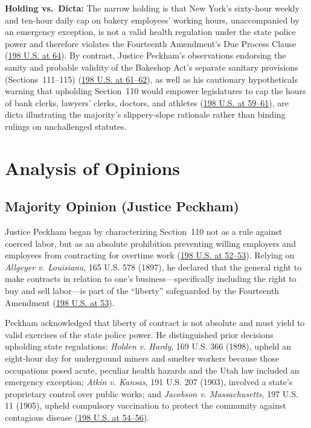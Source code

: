 \documentclass[12pt]{article}
\begin{document}
\textbf{Holding vs.\ Dicta:} The narrow holding is that New York's sixty-hour weekly and ten-hour daily cap on bakery employees' working hours, unaccompanied by an emergency exception, is not a valid health regulation under the state police power and therefore violates the Fourteenth Amendment's Due Process Clause (\href{https://caselaw.findlaw.com/court/us-supreme-court/198/45.html}{198 U.S. at 64}). By contrast, Justice Peckham's observations endorsing the sanity and probable validity of the Bakeshop Act's separate sanitary provisions (Sections~111--115) (\href{https://caselaw.findlaw.com/court/us-supreme-court/198/45.html}{198 U.S. at 61--62}), as well as his cautionary hypotheticals warning that upholding Section~110 would empower legislatures to cap the hours of bank clerks, lawyers' clerks, doctors, and athletes (\href{https://caselaw.findlaw.com/court/us-supreme-court/198/45.html}{198 U.S. at 59--61}), are dicta illustrating the majority's slippery-slope rationale rather than binding rulings on unchallenged statutes.

\section{Analysis of Opinions}

\subsection{Majority Opinion (Justice Peckham)}

Justice Peckham began by characterizing Section~110 not as a rule against coerced labor, but as an absolute prohibition preventing willing employers and employees from contracting for overtime work (\href{https://caselaw.findlaw.com/court/us-supreme-court/198/45.html}{198 U.S. at 52--53}). Relying on \textit{Allgeyer v. Louisiana}, 165 U.S. 578 (1897), he declared that the general right to make contracts in relation to one's business---specifically including the right to buy and sell labor---is part of the ``liberty'' safeguarded by the Fourteenth Amendment (\href{https://caselaw.findlaw.com/court/us-supreme-court/198/45.html}{198 U.S. at 53}).

Peckham acknowledged that liberty of contract is not absolute and must yield to valid exercises of the state police power. He distinguished prior decisions upholding state regulations: \textit{Holden v. Hardy}, 169 U.S. 366 (1898), upheld an eight-hour day for underground miners and smelter workers because those occupations posed acute, peculiar health hazards and the Utah law included an emergency exception; \textit{Atkin v. Kansas}, 191 U.S. 207 (1903), involved a state's proprietary control over public works; and \textit{Jacobson v. Massachusetts}, 197 U.S. 11 (1905), upheld compulsory vaccination to protect the community against contagious disease (\href{https://caselaw.findlaw.com/court/us-supreme-court/198/45.html}{198 U.S. at 54--56}).
\end{document}

